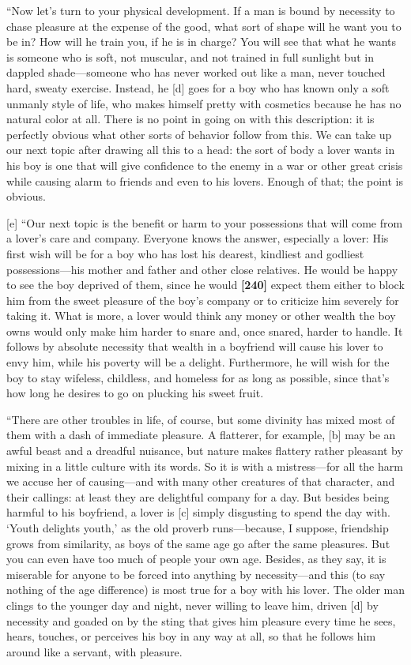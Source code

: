 “Now let's turn to your physical development. If a man is bound by
necessity to chase pleasure at the expense of the good, what sort of
shape will he want you to be in? How will he train you, if he is in
charge? You will see that what he wants is someone who is soft, not
muscular, and not trained in full sunlight but in dappled
shade---someone who has never worked out like a man, never touched hard,
sweaty exercise. Instead, he {[}d{]} goes for a boy who has known only a
soft unmanly style of life, who makes himself pretty with cosmetics
because he has no natural color at all. There is no point in going on
with this description: it is perfectly obvious what other sorts of
behavior follow from this. We can take up our next topic after drawing
all this to a head: the sort of body a lover wants in his boy is one
that will give confidence to the enemy in a war or other great crisis
while causing alarm to friends and even to his lovers. Enough of that;
the point is obvious.

{[}e{]} “Our next topic is the benefit or harm to your possessions that
will come from a lover's care and company. Everyone knows the answer,
especially a lover: His first wish will be for a boy who has lost his
dearest, kindliest and godliest possessions---his mother and father and
other close relatives. He would be happy to see the boy deprived of
them, since he would {\bf {[}240{]}} expect them either to block him
from the sweet pleasure of the boy's company or to criticize him
severely for taking it. What is more, a lover would think any money or
other wealth the boy owns would only make him harder to snare and, once
snared, harder to handle. It follows by absolute necessity that wealth
in a boyfriend will cause his lover to envy him, while his poverty will
be a delight. Furthermore, he will wish for the boy to stay wifeless,
childless, and homeless for as long as possible, since that's how long
he desires to go on plucking his sweet fruit.

“There are other troubles in life, of course, but some divinity has
mixed most of them with a dash of immediate pleasure. A flatterer, for
example, {[}b{]} may be an awful beast and a dreadful nuisance, but
nature makes flattery rather pleasant by mixing in a little culture with
its words. So it is with a mistress---for all the harm we accuse her of
causing---and with many other creatures of that character, and their
callings: at least they are delightful company for a day. But besides
being harmful to his boyfriend, a lover is {[}c{]} simply disgusting to
spend the day with. ‘Youth delights youth,' as the old proverb
runs---because, I suppose, friendship grows from similarity, as boys of
the same age go after the same pleasures. But you can even have too much
of people your own age. Besides, as they say, it is miserable for anyone
to be forced into anything by necessity---and this (to say nothing of
the age difference) is most true for a boy with his lover. The older man
clings to the younger day and night, never willing to leave him, driven
{[}d{]} by necessity and goaded on by the sting that gives him pleasure
every time he sees, hears, touches, or perceives his boy in any way at
all, so that he follows him around like a servant, with pleasure.

